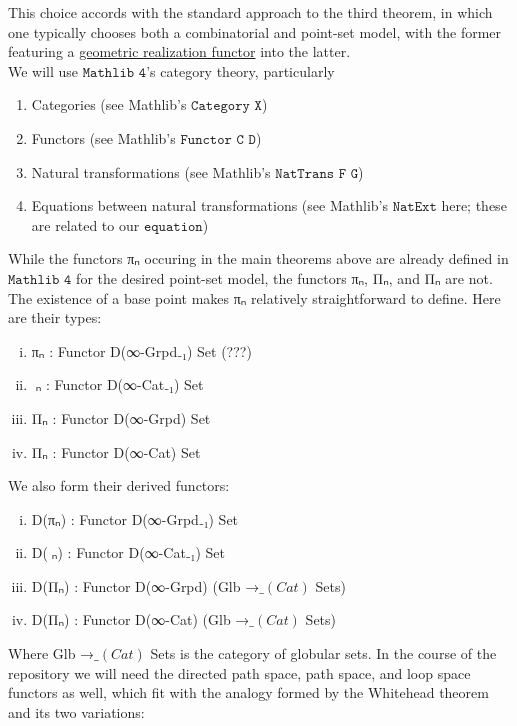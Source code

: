 \documentclass{book}
\theoremstyle{definition}
\begin{document}
This choice accords with the standard approach to the third theorem, in which one typically chooses both a combinatorial and point-set model, with the former featuring a \href{https://github.com/leanprover-community/mathlib4/blob/8666bd82efec40b8b3a5abca02dc9b24bbdf2652/Mathlib/AlgebraicTopology/SimplicialSet.lean#L235-L236}{geometric realization functor} into the latter.\\

We will use $\texttt{Mathlib 4}$'s category theory, particularly

\begin{enumerate}
\item Categories (see Mathlib's $\texttt{Category X}$)
\item Functors (see Mathlib's $\texttt{Functor C D}$)
\item Natural transformations (see Mathlib's $\texttt{NatTrans F G}$)
\item Equations between natural transformations (see Mathlib's $\texttt{NatExt}$ here; these are related to our $\texttt{equation}$)
\end{enumerate}

While the functors πₙ occuring in the main theorems above are already defined in $\texttt{Mathlib 4}$ for the desired point-set model, the functors πₙ, Πₙ, and Π⃗ₙ are not. The existence of a base point makes πₙ relatively straightforward to define. Here are their types:

\begin{enumerate}[(i)]
\item πₙ : Functor D(∞-Grpd₋₁) Set (???)
\item π⃗ₙ : Functor D(∞-Cat₋₁) Set
\item Πₙ : Functor D(∞-Grpd) Set
\item Π⃗ₙ : Functor D(∞-Cat) Set
\end{enumerate}

 We also form their derived functors:

\begin{enumerate}[(i)]
\item D(πₙ) : Functor D(∞-Grpd₋₁) Set
\item D(π⃗ₙ) : Functor D(∞-Cat₋₁) Set
\item D(Πₙ) : Functor D(∞-Grpd) (Glb →$\_(Cat)$ Sets)
\item D(Π⃗ₙ) : Functor D(∞-Cat) (Glb →$\_(Cat)$ Sets)
\end{enumerate}

Where Glb →$\_(Cat)$ Sets is the category of globular sets. In the course of the repository we will need the directed path space, path space, and loop space functors as well, which fit with the analogy formed by the Whitehead theorem and its two variations:
\end{document}
